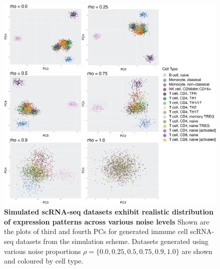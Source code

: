 \begin{figure}
    \centering
    \includegraphics[width=\textwidth]{Figures/sim_data_PC34.png}
    \caption{\textbf{Simulated scRNA-seq datasets exhibit realistic distribution of expression patterns across various noise levels} Shown are the plots of third and fourth PCs for generated immune cell scRNA-seq datasets from the simulation scheme. Datasets generated using various noise proportions $\rho = \{0.0, 0.25, 0.5, 0.75, 0.9, 1.0\}$ are shown and coloured by cell type.}
    \label{fig:ct-pca-supp}
\end{figure}
\renewcommand{\arraystretch}{1}
